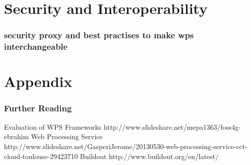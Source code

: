 \documentclass{beamer}
\begin{document}
  \section{Security and Interoperability}

  \begin{frame}
    \frametitle{security proxy and best practises to make wps interchangeable}
  \end{frame}

  \appendix

  \section{Appendix}
  
   \begin{frame}[allowframebreaks]
    \frametitle<presentation>{Further Reading}    
    \begin{thebibliography}{10}    
      \beamertemplatearticlebibitems
      Evaluation of WPS Frameworks
      \newblock http://www.slideshare.net/mepa1363/foss4g-ebrahim
      Web Processing Service
      \newblock http://www.slideshare.net/GasperiJerome/20130530-web-processing-service-cct-cloud-toulouse-29423710
      Buildout
      \newblock http://www.buildout.org/en/latest/
    \end{thebibliography}
    
  \end{frame}
  
\end{document}
